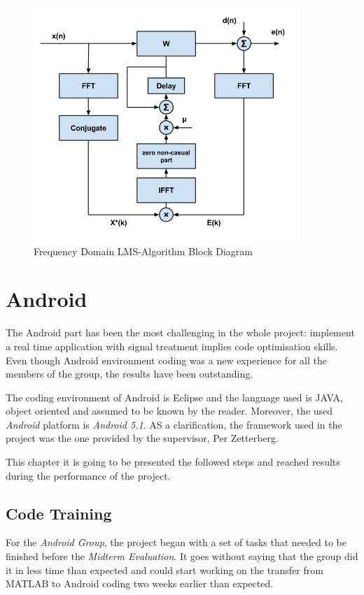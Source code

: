 \documentclass[11pt,a4paper,english]{book}  %
\theoremstyle{definition}  %
\theoremstyle{plain}  %
\theoremstyle{remark}  %
\begin{document}
		\begin{figure}[h]
		\centering
		\includegraphics[width=10cm]{images/theory/freqlms.jpg}
		\caption{Frequency Domain LMS-Algorithm Block Diagram}
		\label{fig:freqlms}
		\end{figure}


\chapter{Android}

The Android part has been the most challenging in the whole project: implement a real time application with signal treatment implies code optimisation skills. Even though Android environment coding was a new experience for all the members of the group, the results have been outstanding.

The coding environment of Android is Eclipse and the language used is JAVA, object oriented and assumed to be known by the reader. Moreover, the used \textit{Android} platform is \textit{Android 5.1}. AS a clarification, the framework used in the project was the one provided by the supervisor, Per Zetterberg.

This chapter it is going to be presented the followed steps and reached results during the performance of the project.

\section{Code Training}

For the \textit{Android Group}, the project began with a set of tasks that needed to be finished before the \textit{Midterm Evaluation}. It goes without saying that the group did it in less time than expected and could start working on the transfer from MATLAB to Android coding two weeks earlier than expected.
\end{document}
